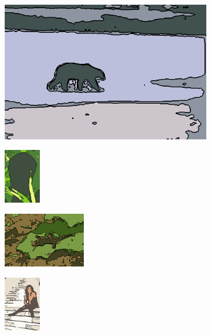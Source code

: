 \documentclass[journal]{IEEEtran}
\begin{document}
\begin{figure}[!ht]
    \begin{subfigure}[t]{\textwidth+20pt\relax}
    	\centering
    	\includegraphics[width=\dimexpr\linewidth-20pt\relax]{100007_Kmeans_const_segm} 
    \end{subfigure}      
    \begin{subfigure}[b]{0.23\textwidth}
    	\centering
        \includegraphics[height=67.68857pt]{101084_Kmeans_const_segm}
    \end{subfigure}
    \begin{subfigure}[b]{0.23\textwidth}
    	\centering
        \includegraphics[height=67.68857pt]{175083_Kmeans_const_segm}
    \end{subfigure}
    \begin{subfigure}[b]{0.23\textwidth}
    	\centering
        \includegraphics[height=67.68857pt]{181021_Kmeans_const_segm}
    \end{subfigure} \\ 
       

\end{figure}
\end{document}
